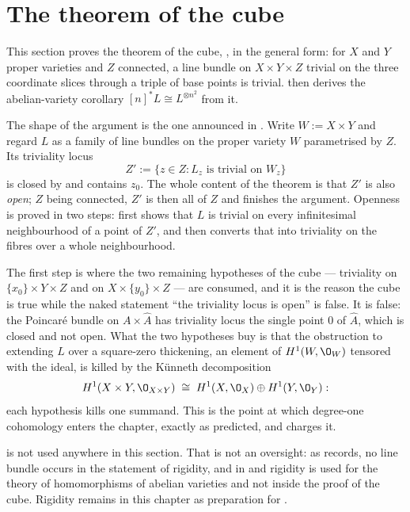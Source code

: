 \section{The theorem of the cube}\label{sec:cube-cube}

This section proves the theorem of the cube, , in the
general form: for $X$ and $Y$ proper varieties and $Z$ connected, a line
bundle on $X\times Y\times Z$ trivial on the three coordinate slices through a
triple of base points is trivial.   then derives the
abelian-variety corollary $[n]^*L\cong L^{\otimes n^2}$ from it.

The shape of the argument is the one announced in
.  Write $W:=X\times Y$ and regard $L$ as a
family of line bundles on the proper variety $W$ parametrised by $Z$.  Its
triviality locus
\[
  Z':=\{z\in Z:L_z\text{ is trivial on }W_z\}
\]
is closed by  and contains $z_0$.  The whole
content of the theorem is that $Z'$ is also \emph{open}; $Z$ being connected,
$Z'$ is then all of $Z$ and  finishes the
argument.  Openness is proved in two steps: first
 shows that $L$ is trivial on every
infinitesimal neighbourhood of a point of $Z'$, and then
 converts that into triviality on the fibres
over a whole neighbourhood.

The first step is where the two remaining hypotheses of the cube --- triviality
on $\{x_0\}\times Y\times Z$ and on $X\times\{y_0\}\times Z$ --- are consumed,
and it is the reason the cube is true while the naked statement ``the
triviality locus is open'' is false.  It is false: the Poincar\'e bundle on
$A\times\widehat A$ has triviality locus the single point $0$ of $\widehat A$,
which is closed and not open.  What the two hypotheses buy is that the
obstruction to extending $L$ over a square-zero thickening, an element of
$H^1(W,\O_W)$ tensored with the ideal, is killed by the K\"unneth
decomposition
\[
  H^1(X\times Y,\O_{X\times Y})\;\cong\;H^1(X,\O_X)\oplus H^1(Y,\O_Y):
\]
each hypothesis kills one summand.  This is the point at which degree-one
cohomology enters the chapter, exactly as 
predicted, and  charges it.

 is not used anywhere in this section.  That is not an
oversight: as  records, no line bundle occurs
in the statement of rigidity, and in \cite{MumfordAbelianVarieties} and
\cite{MilneAbelianVarieties} rigidity is used for the theory of homomorphisms
of abelian varieties and not inside the proof of the cube.  Rigidity remains in
this chapter as preparation for .

